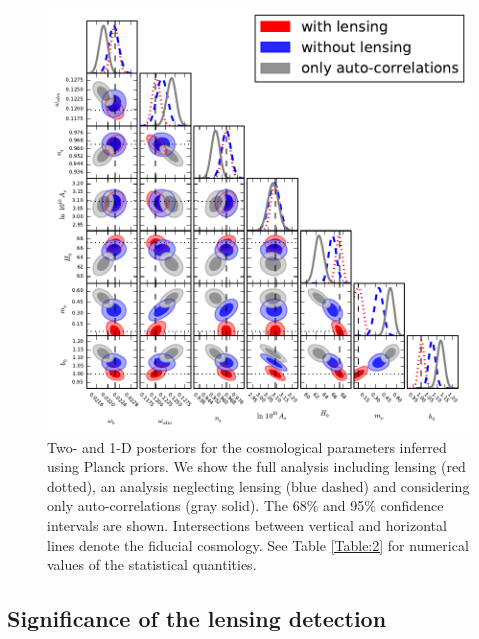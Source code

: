 \begin{figure}[bthp]
  \centering
  \includegraphics[scale=1.2]{figures/chapter-mnu/triangle_figure_MCDM_bias_cmb_prior.pdf}
  \caption{Two- and 1-D posteriors for the cosmological parameters inferred using Planck priors. We show the full analysis including lensing (red dotted), an analysis neglecting lensing (blue dashed) and considering only auto-correlations (gray solid).
    The 68\% and 95\% confidence intervals are shown.
    Intersections between vertical and horizontal lines denote the fiducial cosmology.
   See Table \ref{Table:2} for numerical values of the statistical quantities.
  }
  \label{fig:mcmc-cmb-prior}
\end{figure}

\subsection{Significance of the lensing detection}

